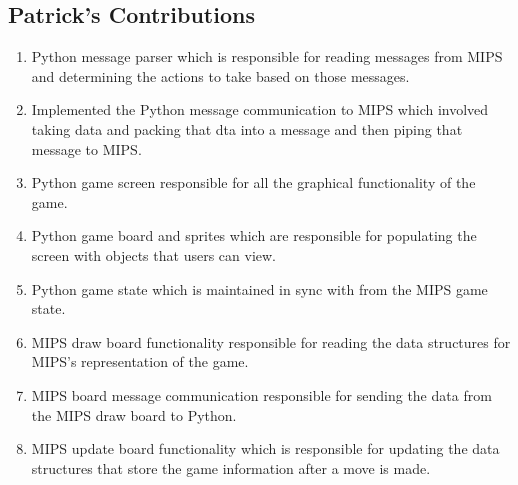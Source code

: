 \documentclass[]{article}
\begin{document}
\subsection*{Patrick's Contributions}
\begin{enumerate}
\item Python message parser which is responsible for reading messages from MIPS and determining the actions to take based on those messages.

\item Implemented the Python message communication to MIPS which involved taking data and packing that dta into a message and then piping that message to MIPS. 

\item Python game screen responsible for all the graphical functionality of the game.

\item Python game board and sprites which are responsible for populating the screen with objects that users can view.

\item Python game state which is maintained in sync with from the MIPS game state.

\item MIPS draw board functionality responsible for reading the data structures for MIPS's representation of the game.

\item MIPS board message communication responsible for sending the data from the MIPS draw board to Python.

\item MIPS update board functionality which is responsible for updating the data structures that store the game information after a move is made.
\end{enumerate}
\end{document}
